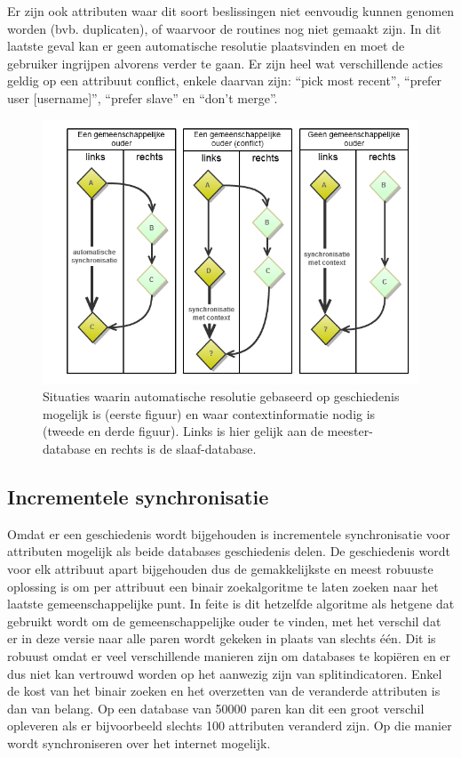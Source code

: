 Er zijn ook attributen waar dit soort beslissingen niet eenvoudig kunnen genomen worden (bvb. duplicaten), of waarvoor de routines nog niet gemaakt zijn. In dit laatste geval kan er geen automatische resolutie plaatsvinden en moet de gebruiker ingrijpen alvorens verder te gaan. Er zijn heel wat verschillende acties geldig op een attribuut conflict, enkele daarvan zijn: ``pick most recent'', ``prefer user [username]'', ``prefer slave'' en ``don't merge''.

\begin{figure}[ht]
	\begin{center}
		\includegraphics[width=1.0\columnwidth]{images/3-way-merge.png}
		\caption{Situaties waarin automatische resolutie gebaseerd op geschiedenis mogelijk is (eerste figuur) en waar contextinformatie nodig is (tweede en derde figuur). Links is hier gelijk aan de meester-database en rechts is de slaaf-database.}
		\label{fig:okay-3-way}
	\end{center}
\end{figure}

\subsection{Incrementele synchronisatie}
Omdat er een geschiedenis wordt bijgehouden is incrementele synchronisatie voor attributen mogelijk als beide databases geschiedenis delen. De geschiedenis wordt voor elk attribuut apart bijgehouden dus de gemakkelijkste en meest robuuste oplossing is om per attribuut een binair zoekalgoritme te laten zoeken naar het laatste gemeenschappelijke punt. In feite is dit hetzelfde algoritme als hetgene dat gebruikt wordt om de gemeenschappelijke ouder te vinden, met het verschil dat er in deze versie naar alle paren wordt gekeken in plaats van slechts \'e\'en. Dit is robuust omdat er veel verschillende manieren zijn om databases te kopi\"eren en er dus niet kan vertrouwd worden op het aanwezig zijn van splitindicatoren. Enkel de kost van het binair zoeken en het overzetten van de veranderde attributen is dan van belang. Op een database van 50000 paren kan dit een groot verschil opleveren als er bijvoorbeeld slechts 100 attributen veranderd zijn. Op die manier wordt synchroniseren over het internet mogelijk. 